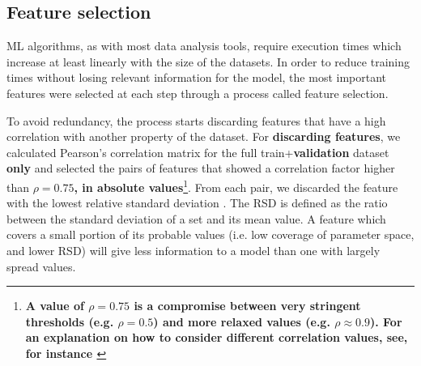 \documentclass{aa}
\begin{document}
\subsection{Feature selection}\label{sec:feat_selection}

ML algorithms, as with most data analysis tools, require execution times which increase at least linearly with the size of the datasets. In order to reduce training times without losing relevant information for the model, the most important features were selected at each step through a process called feature selection. 

To avoid redundancy, the process starts discarding features that have a high correlation with another property of the dataset. For \textbf{discarding features}, we calculated Pearson's correlation matrix for the full train+\textbf{validation} dataset \textbf{only} and selected the pairs of features that showed a correlation factor higher than $\rho = 0.75$\textbf{, in absolute values}\footnote{\textbf{A value of $\rho = 0.75$ is a compromise between very stringent thresholds (e.g. $\rho = 0.5$) and more relaxed values (e.g. $\rho \approx 0.9$). For an explanation on how to consider different correlation values, see, for instance \citet{Ratner2009}}}. From each pair, we discarded the feature with the lowest relative standard deviation \citep[RSD;][]{johnson1964statistics}. The RSD is defined as the ratio between the standard deviation of a set and its mean value. A feature which covers a small portion of its probable values (i.e. low coverage of parameter space, and lower RSD) will give less information to a model than one with largely spread values.

\end{document}
